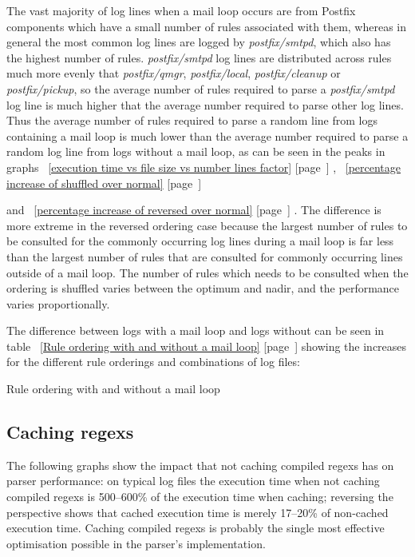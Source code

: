 \documentclass[a4paper,12pt,draft]{article}
\newcommand{\showtable}[3]{
    \begin{table}[ht]
        \caption{#2}\label{#3}
        
    \end{table}
}
\newcommand{\refwithpage}[1]{%
    \empty{}\ref{#1} [page~\pageref{#1}]%
}
\begin{document}
The vast majority of log lines when a mail loop occurs are from Postfix
components which have a small number of rules associated with them, whereas
in general the most common log lines are logged by \textit{postfix/smtpd},
which also has the highest number of rules.  \textit{postfix/smtpd\/} log
lines are distributed across rules much more evenly that
\textit{postfix/qmgr}, \textit{postfix/local}, \textit{postfix/cleanup\/}
or \textit{postfix/pickup}, so the average number of rules required to
parse a \textit{postfix/smtpd\/} log line is much higher that the average
number required to parse other log lines.  Thus the average number of rules
required to parse a random line from logs containing a mail loop is much
lower than the average number required to parse a random log line from logs
without a mail loop, as can be seen in the peaks in
graphs~\refwithpage{execution time vs file size vs number lines
factor},~\refwithpage{percentage increase of shuffled over normal}
and~\refwithpage{percentage increase of reversed over normal}.  The
difference is more extreme in the reversed ordering case because the
largest number of rules to be consulted for the commonly occurring log
lines during a mail loop is far less than the largest number of rules that
are consulted for commonly occurring lines outside of a mail loop.  The
number of rules which needs to be consulted when the ordering is shuffled
varies between the optimum and nadir, and the performance varies
proportionally.

The difference between logs with a mail loop and logs without can be seen
in table~\refwithpage{Rule ordering with and without a mail loop} showing
the increases for the different rule orderings and combinations of log
files:

\showtable{build/stats-normal-shuffle-reverse-include}{Rule ordering with
and without a mail loop}{Rule ordering with and without a mail loop}



\subsection{Caching regexs}

The following graphs show the impact that not caching compiled regexs has
on parser performance: on typical log files the execution time when not
caching compiled regexs is 500--600\% of the execution time when caching;
reversing the perspective shows that cached execution time is merely
17--20\% of non-cached execution time.  Caching compiled regexs is probably
the single most effective optimisation possible in the parser's
implementation.
\end{document}
